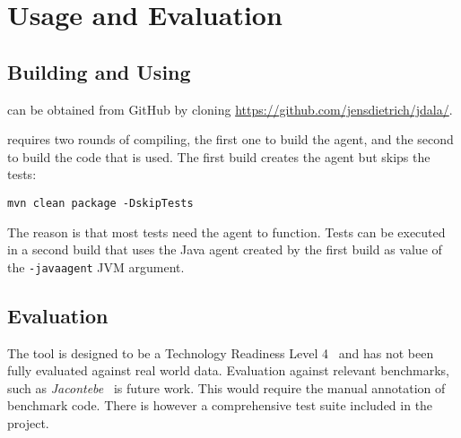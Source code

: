 \section{Usage and Evaluation}
\label{sec:useandevaluate}	


\subsection{Building and Using \jdala}

\jdala can be obtained from GitHub by cloning \url{https://github.com/jensdietrich/jdala/}.


\jdala requires two rounds of compiling, the first one to build the agent, and the second to build the code that is used. The first build creates the agent but skips the tests:

\texttt{mvn clean package -DskipTests}

The reason is that most tests need the agent to function. Tests can be executed in a second build that uses the Java agent created by the first build as value of the \texttt{-javaagent} JVM argument.

\subsection{Evaluation}


The tool is designed to be a Technology Readiness Level 4~\cite{mankins1995technology} and has not been fully evaluated against real world data. Evaluation against relevant  benchmarks, such as \textit{Jacontebe}~\cite{lin2015jacontebe} is future work. This would require the manual annotation of benchmark code. There is however a comprehensive test suite included in the project.  


